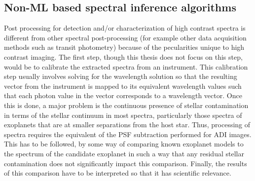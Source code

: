 \subsection{Non-ML based spectral inference algorithms }
Post processing for detection and/or characterization of high contrast spectra is different from other spectral post-processing (for example other data acquisition methods such as transit photometry) because of the pecularities unique to high contrast imaging.
The first step, though this thesis does not focus on this step, would be to calibrate the extracted spectra from an instrument.
This calibration step usually involves solving for the wavelength solution so that the resulting vector from the instrument is mapped to its equivalent wavelength values such that each photon value in the vector corresponds to a wavelength vector.
Once this is done, a major problem is the continuous presence of stellar contamination in terms of the stellar continuum in most spectra, particularly those spectra of exoplanets that are at smaller separations from the host star.
Thus, processing of spectra requires the equivalent of the PSF subtraction performed for ADI images.
This has to be followed, by some way of comparing known exoplanet models to the spectrum of the candidate exoplanet in such a way that any residual stellar contamination does not significantly impact this comparison.
Finally, the results of this comparison have to be interpreted so that it has scientific relevance.

